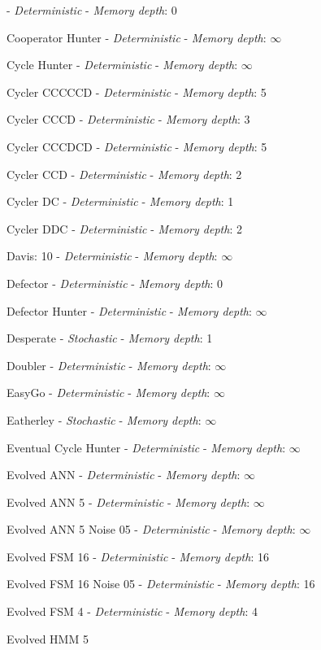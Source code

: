  - \textit{Deterministic} - \textit{Memory depth}: 0\item Cooperator Hunter
 - \textit{Deterministic} - \textit{Memory depth}: \(\infty\)\item Cycle Hunter
 - \textit{Deterministic} - \textit{Memory depth}: \(\infty\)\item Cycler CCCCCD
 - \textit{Deterministic} - \textit{Memory depth}: 5\item Cycler CCCD
 - \textit{Deterministic} - \textit{Memory depth}: 3\item Cycler CCCDCD
 - \textit{Deterministic} - \textit{Memory depth}: 5\item Cycler CCD
 - \textit{Deterministic} - \textit{Memory depth}: 2\item Cycler DC
 - \textit{Deterministic} - \textit{Memory depth}: 1\item Cycler DDC
 - \textit{Deterministic} - \textit{Memory depth}: 2\item Davis: 10
 - \textit{Deterministic} - \textit{Memory depth}: \(\infty\)\item Defector
 - \textit{Deterministic} - \textit{Memory depth}: 0\item Defector Hunter
 - \textit{Deterministic} - \textit{Memory depth}: \(\infty\)\item Desperate
 - \textit{Stochastic} - \textit{Memory depth}: 1\item Doubler
 - \textit{Deterministic} - \textit{Memory depth}: \(\infty\)\item EasyGo
 - \textit{Deterministic} - \textit{Memory depth}: \(\infty\)\item Eatherley
 - \textit{Stochastic} - \textit{Memory depth}: \(\infty\)\item Eventual Cycle Hunter
 - \textit{Deterministic} - \textit{Memory depth}: \(\infty\)\item Evolved ANN
 - \textit{Deterministic} - \textit{Memory depth}: \(\infty\)\item Evolved ANN 5
 - \textit{Deterministic} - \textit{Memory depth}: \(\infty\)\item Evolved ANN 5 Noise 05
 - \textit{Deterministic} - \textit{Memory depth}: \(\infty\)\item Evolved FSM 16
 - \textit{Deterministic} - \textit{Memory depth}: 16\item Evolved FSM 16 Noise 05
 - \textit{Deterministic} - \textit{Memory depth}: 16\item Evolved FSM 4
 - \textit{Deterministic} - \textit{Memory depth}: 4\item Evolved HMM 5
